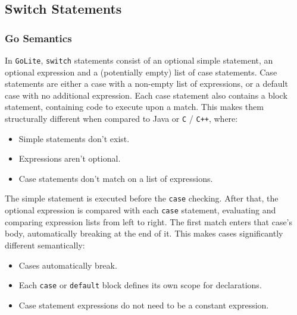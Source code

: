\documentclass[11pt]{article}
\begin{document}
\subsection{Switch Statements}
\label{sec:org6ef8b5d}
\subsubsection{Go Semantics}
\label{sec:org7f2ae3b}
In \texttt{GoLite}, \texttt{switch} statements consist of an optional simple
statement, an optional expression and a (potentially empty) list
of case statements. Case statements are either a case with a
non-empty list of expressions, or a default case with no additional expression.
Each case statement also contains a block statement, containing code to execute
upon a match. This makes
them structurally different when compared to Java or \texttt{C} / \texttt{C++}, where:
\begin{itemize}[noitemsep]
\item Simple statements don't exist.
\item Expressions aren't optional.
\item Case statements don't match on a list of expressions.
\end{itemize}
The simple statement is executed before the \texttt{case} checking.
After that, the optional expression is compared with each \texttt{case}
statement, evaluating and comparing expression lists from left to
right. The first match enters that case's body, automatically
breaking at the end of it. This makes cases significantly different
semantically:
\begin{itemize}[noitemsep]
\item Cases automatically break.
\item Each \texttt{case} or \texttt{default} block defines its own scope for declarations.
\item Case statement expressions do not need to be a constant expression.
\end{itemize}
\end{document}
